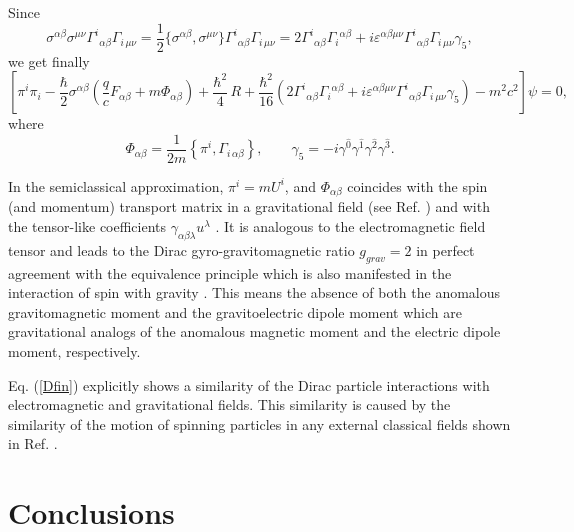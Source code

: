\documentclass[preprint,showpacs,preprintnumbers,eqsecnum,amsmath,amssymb]{revtex4}
\begin{document}
Since $$\sigma^{\alpha\beta}\sigma^{\mu\nu}\Gamma^i{}_{\alpha\beta}
\Gamma_{i\,\mu\nu}=\frac12\{\sigma^{\alpha\beta},\sigma^{\mu\nu}\}
\Gamma^i{}_{\alpha\beta}\Gamma_{i\,\mu\nu}=2\Gamma^i{}_{\alpha\beta}
\Gamma_i{}^{\alpha\beta}+i\varepsilon^{\alpha\beta\mu\nu}\Gamma^i{}_{\alpha\beta}
\Gamma_{i\,\mu\nu}\gamma_5,$$ we get finally
\begin{equation}
\left[\pi^{i}\pi_{i} - \frac {\hbar}{2}\sigma^{\alpha\beta}\left(\frac {q}{c} 
F_{\alpha\beta} + m\Phi_{\alpha\beta}\right) + {\frac {\hbar^2}4}\,R + {\frac
{\hbar^2}{16}}\left(2\Gamma^i{}_{\alpha\beta}\Gamma_i{}^{\alpha\beta}+ 
i\varepsilon^{\alpha\beta\mu\nu}\Gamma^i{}_{\alpha\beta}\Gamma_{i\,\mu\nu}
\gamma_5\right)- m^2c^2\right]\psi = 0,\label{Dfin}
\end{equation}
where 
\begin{equation} 
\Phi_{\alpha\beta}=\frac {1}{2m}\left\{\pi^{i}, \Gamma_{i\,\alpha\beta}\right\},
\qquad \gamma_5=-i\gamma^{\widehat{0}}\gamma^{\widehat{1}}\gamma^{\widehat{2}}
\gamma^{\widehat{3}}.\label{PKc}
\end{equation}

In the semiclassical approximation, $\pi^{i}=mU^{i}$, and
$\Phi_{\alpha\beta}$ coincides with the spin (and momentum)
transport matrix in a gravitational field (see Ref. \cite{OST})
and with the tensor-like coefficients $\gamma_{\alpha\beta
\lambda}u^{\lambda}$ \cite{PK}. It is analogous to the
electromagnetic field tensor and leads to the Dirac
gyro-gravitomagnetic ratio $g_{grav}=2$ in perfect agreement with
the equivalence principle which is also manifested in the
interaction of spin with gravity \cite{KO}. This means
\cite{Teryaev:2003ch} the absence of both the anomalous
gravitomagnetic moment and the gravitoelectric dipole moment which
are gravitational analogs of the anomalous magnetic moment and the
electric dipole moment, respectively.

Eq. (\ref{Dfin}) explicitly shows a similarity of the Dirac
particle interactions with electromagnetic and gravitational
fields. This similarity is caused by the similarity of the motion
of spinning particles in any external classical fields shown in
Ref. \cite{OST}.


\section{Conclusions}\label{final}
\end{document}

